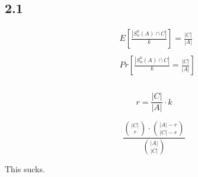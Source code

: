 \subsection*{2.1}

\begin{align*}
    &E\left[ \frac{|S^{k}_{n}(A) \cap C |}{k}\right] = \frac{|C|}{|A|}\\\\
    &Pr\left[ \frac{|S^{k}_{n}(A) \cap C |}{k} = \frac{|C|}{|A|}\right]\\\\
\end{align*}

\begin{equation}
    r = \frac{|C|}{|A|} \cdot k
\end{equation}

\begin{equation}
    \frac{ {|C|\choose r} \cdot {|A| - r \choose |C| - r}} {{|A| \choose |C|}}
\end{equation}

This sucks.

